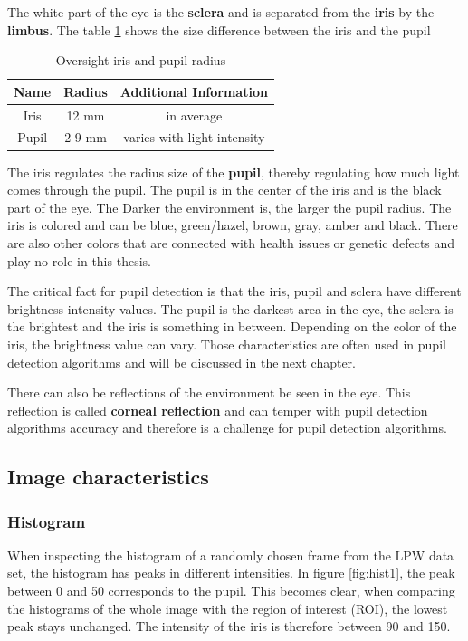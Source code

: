     The white part of the eye is the \textbf{sclera} and is separated from the \textbf{iris} by the \textbf{limbus}. The table \ref{tab:eye_char} shows the size difference between the iris and the pupil
    \begin{table}[h]
      \centering 
      \begin{minipage}{0.7\textwidth}
        \centering
        \begin{tabular}{|c|c|c|}
          \hline
          Name & Radius & Additional Information \\
          \hline
          Iris & 12 mm & in average\\
          Pupil & 2-9 mm & varies with light intensity\\
          \hline
        \end{tabular}
        \caption{Oversight iris and pupil radius}
        \label{tab:eye_char}
      \end{minipage}\hfill
    \end{table}
 

    The iris regulates the radius size of the \textbf{pupil}, thereby regulating how much light comes through the pupil. The pupil is in the center of the iris and is the black part of the eye. The Darker the environment is, the larger the pupil radius. The iris is colored and can be blue, green/hazel, brown, gray, amber and black. There are also other colors that are connected with health issues or genetic defects and play no role in this thesis. 

    The critical fact for pupil detection is that the iris, pupil and sclera have different brightness intensity values. The pupil is the darkest area in the eye, the sclera is the brightest and the iris is something in between. Depending on the color of the iris, the brightness value can vary. Those characteristics are often used in pupil detection algorithms and will be discussed in the next chapter.

    There can also be reflections of the environment be seen in the eye. This reflection is called \textbf{corneal reflection} and can temper with pupil detection algorithms accuracy and therefore is a challenge for pupil detection algorithms.


    \subsection{Image characteristics}
    \subsubsection{Histogram}
    When inspecting the histogram of a randomly chosen frame from the LPW data set, the histogram has peaks in different intensities. In figure \ref{fig:hist1}, the peak between 0 and 50 corresponds to the pupil. This becomes clear, when comparing the histograms of the whole image with the region of interest (ROI), the lowest peak stays unchanged. The intensity of the iris is therefore between 90 and 150.

